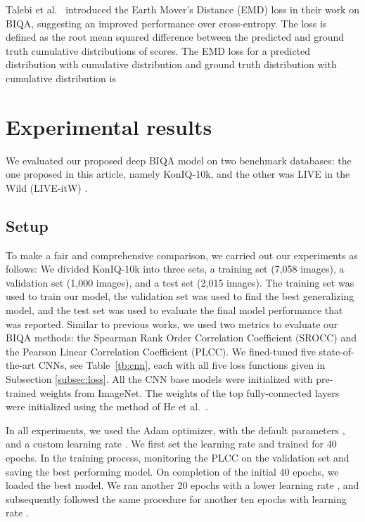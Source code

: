 \documentclass[10pt,journal,compsoc]{IEEEtran}
\begin{document}
Talebi et al.~\cite{talebi_nima_2017} introduced the Earth Mover's Distance (EMD) loss in their work on BIQA, suggesting an improved performance over cross-entropy. The loss is defined as the root mean squared difference between the predicted and ground truth cumulative distributions of scores.
The EMD loss for a predicted distribution  with cumulative distribution  and ground truth distribution  with cumulative distribution  is



\section{Experimental results}


We evaluated our proposed deep BIQA model on two benchmark databases: the one  proposed in this article, namely KonIQ-10k, and the other was LIVE in the Wild (LIVE-itW) \cite{ghadiyaram:2016massive}. 


\subsection{Setup}
To make a fair and comprehensive comparison, we carried out our experiments as follows: We divided KonIQ-10k into three sets, a training set (7,058 images), a validation set (1,000 images), and a test set (2,015 images). The training set was used to train our model, the validation set was used to find the best generalizing model, and the test set was used to evaluate the final model performance that was reported.
Similar to previous works, we used two metrics to evaluate our BIQA methods: the Spearman Rank Order Correlation Coefficient (SROCC) and the Pearson Linear Correlation Coefficient (PLCC). We fined-tuned five state-of-the-art CNNs, see Table~\ref{tb:cnn}, each with all five loss functions given in Subsection \ref{subsec:loss}. All the CNN base models were initialized with pre-trained weights from ImageNet. The weights of the top fully-connected layers were initialized using the method of He et al.~\cite{henormal}. 

In all experiments, we used the Adam \cite{kingma2014adam} optimizer, with the default parameters ,  and a custom learning rate . We first set the learning rate  and trained for 40 epochs. In the training process, monitoring the PLCC on the validation set and saving the best performing model. On completion of the initial 40 epochs, we loaded the best model. We ran another 20 epochs with a lower learning rate , and subsequently followed the same procedure for another ten epochs with learning rate .
\end{document}
